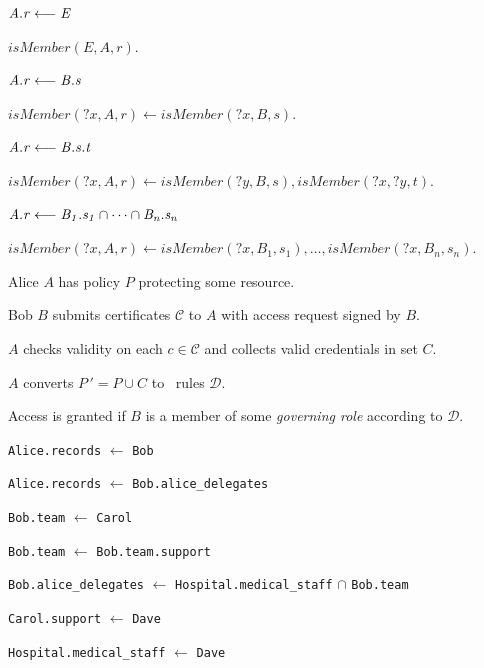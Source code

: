 
\begin{cenumerate}
\item $\mathit{A.r} \stackrel{}{\longleftarrow} \mathit{E}$

$\textit{isMember}(E, A, r).$

\item $\mathit{A.r} \stackrel{}{\longleftarrow} \mathit{B.s}$

$\textit{isMember}(\textit{?x}, A, r) \leftarrow
 \textit{isMember}(\textit{?x}, B, s).$

\item $\mathit{A.r} \stackrel{}{\longleftarrow} \mathit{B.s.t}$

$\textit{isMember}(\textit{?x}, A, r) \leftarrow
 \textit{isMember}(\textit{?y}, B, s),
 \textit{isMember}(\textit{?x}, \textit{?y}, t).$

\item $\mathit{A.r} \stackrel{}{\longleftarrow} \mathit{B_1.s_1 \cap \cdots \cap B_n.s_n}$

$\textit{isMember}(\textit{?x}, A, r) \leftarrow
 \textit{isMember}(\textit{?x}, B_1, s_1), \ldots,
 \textit{isMember}(\textit{?x}, B_n, s_n).$
\end{cenumerate}
\stopslide


\begin{cenumerate}
\item Alice $A$ has policy $P$ protecting some resource.
\item Bob $B$ submits certificates $\mathcal{C}$ to $A$ with access request signed by $B$.
\item $A$ checks validity on each $c \in \mathcal{C}$ and collects valid credentials in set $C$.
\item $A$ converts $P\,' = P \cup C$ to \datalog\ rules $\mathcal{D}$.
\item Access is granted if $B$ is a member of some \textit{governing role} according to
  $\mathcal{D}$.
\end{cenumerate}
\stopslide


\begin{citemize}
\item \texttt{Alice.records} $\leftarrow$ \texttt{Bob}
\item \texttt{Alice.records} $\leftarrow$ \texttt{Bob.alice\_delegates}
\item \texttt{Bob.team} $\leftarrow$ \texttt{Carol}
\item \texttt{Bob.team} $\leftarrow$ \texttt{Bob.team.support}
\item \texttt{Bob.alice\_delegates} $\leftarrow$
  \texttt{Hospital.medical\_staff} $\cap$ \texttt{Bob.team}
\item \texttt{Carol.support} $\leftarrow$ \texttt{Dave}
\item \texttt{Hospital.medical\_staff} $\leftarrow$ \texttt{Dave}
\end{citemize}
\stopslide

